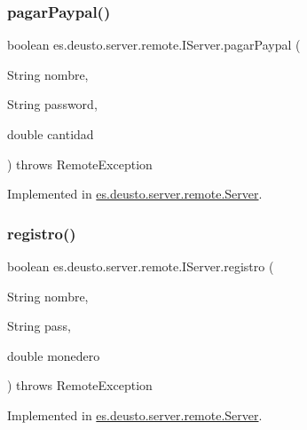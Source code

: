 \mbox{\label{interfacees_1_1deusto_1_1server_1_1remote_1_1_i_server_ae5fa0451aba57506212a5bd3674c060a}} 
\subsubsection{\texorpdfstring{pagarPaypal()}{pagarPaypal()}}
{\footnotesize\ttfamily boolean es.\+deusto.\+server.\+remote.\+I\+Server.\+pagar\+Paypal (\begin{DoxyParamCaption}\item[{String}]{nombre,  }\item[{String}]{password,  }\item[{double}]{cantidad }\end{DoxyParamCaption}) throws Remote\+Exception}



Implemented in \mbox{\hyperlink{classes_1_1deusto_1_1server_1_1remote_1_1_server_a31c17e7534d892c61a2ac36c87e08dbc}{es.\+deusto.\+server.\+remote.\+Server}}.

\mbox{\label{interfacees_1_1deusto_1_1server_1_1remote_1_1_i_server_ac293a07e02b5c832d25954fbbec4d92c}} 
\subsubsection{\texorpdfstring{registro()}{registro()}}
{\footnotesize\ttfamily boolean es.\+deusto.\+server.\+remote.\+I\+Server.\+registro (\begin{DoxyParamCaption}\item[{String}]{nombre,  }\item[{String}]{pass,  }\item[{double}]{monedero }\end{DoxyParamCaption}) throws Remote\+Exception}



Implemented in \mbox{\hyperlink{classes_1_1deusto_1_1server_1_1remote_1_1_server_abd8ccf5305f02831be069dd3b53a3b5d}{es.\+deusto.\+server.\+remote.\+Server}}.

